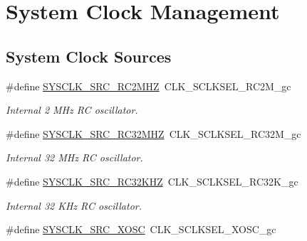 \hypertarget{group__sysclk__group}{\section{System Clock Management}
\label{group__sysclk__group}
}
\subsection*{System Clock Sources}
\begin{DoxyCompactItemize}
\item 
\hypertarget{group__sysclk__group_gaaa8edbb5a577a618143af56c1949c3df}{\#define \hyperlink{group__sysclk__group_gaaa8edbb5a577a618143af56c1949c3df}{S\-Y\-S\-C\-L\-K\-\_\-\-S\-R\-C\-\_\-\-R\-C2\-M\-H\-Z}~C\-L\-K\-\_\-\-S\-C\-L\-K\-S\-E\-L\-\_\-\-R\-C2\-M\-\_\-gc}\label{group__sysclk__group_gaaa8edbb5a577a618143af56c1949c3df}

\begin{DoxyCompactList}\small\item\em Internal 2 M\-Hz R\-C oscillator. \end{DoxyCompactList}\item 
\hypertarget{group__sysclk__group_gad7a4daac37122837b0a892f7d6e19742}{\#define \hyperlink{group__sysclk__group_gad7a4daac37122837b0a892f7d6e19742}{S\-Y\-S\-C\-L\-K\-\_\-\-S\-R\-C\-\_\-\-R\-C32\-M\-H\-Z}~C\-L\-K\-\_\-\-S\-C\-L\-K\-S\-E\-L\-\_\-\-R\-C32\-M\-\_\-gc}\label{group__sysclk__group_gad7a4daac37122837b0a892f7d6e19742}

\begin{DoxyCompactList}\small\item\em Internal 32 M\-Hz R\-C oscillator. \end{DoxyCompactList}\item 
\hypertarget{group__sysclk__group_ga0775e9de5d25b08f9c02e292d4506d42}{\#define \hyperlink{group__sysclk__group_ga0775e9de5d25b08f9c02e292d4506d42}{S\-Y\-S\-C\-L\-K\-\_\-\-S\-R\-C\-\_\-\-R\-C32\-K\-H\-Z}~C\-L\-K\-\_\-\-S\-C\-L\-K\-S\-E\-L\-\_\-\-R\-C32\-K\-\_\-gc}\label{group__sysclk__group_ga0775e9de5d25b08f9c02e292d4506d42}

\begin{DoxyCompactList}\small\item\em Internal 32 K\-Hz R\-C oscillator. \end{DoxyCompactList}\item 
\hypertarget{group__sysclk__group_ga5f3a380af0ad95a5bcf337bb30fd8f96}{\#define \hyperlink{group__sysclk__group_ga5f3a380af0ad95a5bcf337bb30fd8f96}{S\-Y\-S\-C\-L\-K\-\_\-\-S\-R\-C\-\_\-\-X\-O\-S\-C}~C\-L\-K\-\_\-\-S\-C\-L\-K\-S\-E\-L\-\_\-\-X\-O\-S\-C\-\_\-gc}\label{group__sysclk__group_ga5f3a380af0ad95a5bcf337bb30fd8f96}


\end{DoxyCompactItemize}
